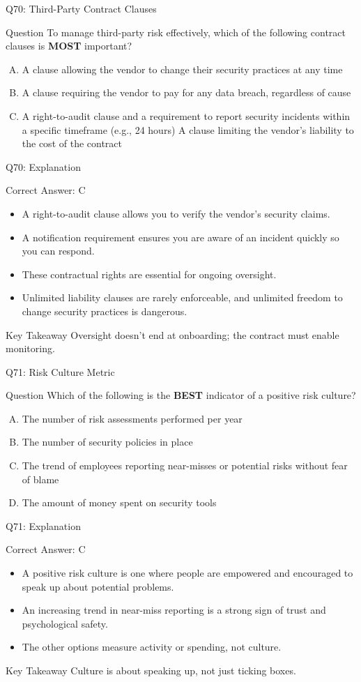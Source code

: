 \documentclass[aspectratio=169]{beamer}
\newcommand{\hq}[7]{%
	\begin{frame}{Q#1: #2}
		\begin{block}{Question}
			#3
		\end{block}
		\begin{enumerate}[(A)]
			#4
		\end{enumerate}
	\end{frame}
	\begin{frame}{Q#1: Explanation}
		\begin{block}{Correct Answer: #5}
			\begin{itemize}
				#6
			\end{itemize}
		\end{block}
		\begin{alertblock}{Key Takeaway}
			#7
		\end{alertblock}
	\end{frame}
}
\begin{document}
{		\hq{70}{Third-Party Contract Clauses}
		{To manage third-party risk effectively, which of the following contract clauses is \textbf{MOST} important?}
		{\item A clause allowing the vendor to change their security practices at any time
			\item A clause requiring the vendor to pay for any data breach, regardless of cause
			\item A right-to-audit clause and a requirement to report security incidents within a specific timeframe (e.g., 24 hours)
			\ditem A clause limiting the vendor's liability to the cost of the contract}
		{C}
		{\item A right-to-audit clause allows you to verify the vendor's security claims.
			\item A notification requirement ensures you are aware of an incident quickly so you can respond.
			\item These contractual rights are essential for ongoing oversight.
			\item Unlimited liability clauses are rarely enforceable, and unlimited freedom to change security practices is dangerous.}
		{Oversight doesn't end at onboarding; the contract must enable monitoring.}
		
		\hq{71}{Risk Culture Metric}
		{Which of the following is the \textbf{BEST} indicator of a positive risk culture?}
		{\item The number of risk assessments performed per year
			\item The number of security policies in place
			\item The trend of employees reporting near-misses or potential risks without fear of blame
			\item The amount of money spent on security tools}
		{C}
		{\item A positive risk culture is one where people are empowered and encouraged to speak up about potential problems.
			\item An increasing trend in near-miss reporting is a strong sign of trust and psychological safety.
			\item The other options measure activity or spending, not culture.}
		{Culture is about speaking up, not just ticking boxes.}
		
}
\end{document}
